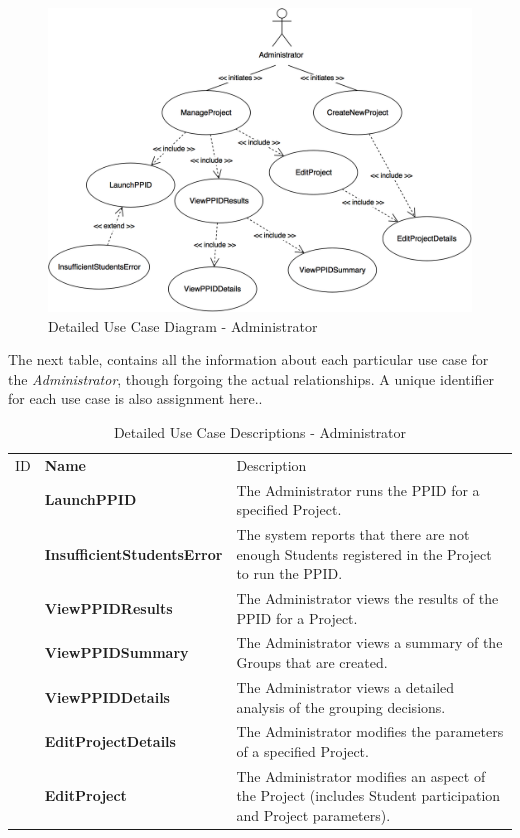 \documentclass[12pt,letterpaper]{article}
\begin{document}
\begin{figure}[H]
	\centering{}
	\includegraphics[scale=0.26]{imgs/detailed-administrator-use-case-diagram.png}
	\caption{Detailed Use Case Diagram - Administrator}
\end{figure}
The next table,  contains all the information about each particular use case for the {\it Administrator}, though forgoing the actual relationships. A unique identifier for each use case is also assignment here.. %

\begin{table}[H]
	\caption{Detailed Use Case Descriptions - Administrator}
	\begin{tabu} to 
	    \tableheader{}ID & Name & Description\\
		\launchppid{} & LaunchPPID & The Administrator runs the PPID for a specified Project.\\
		\insufficientstudentserror{} & InsufficientStudentsError & The system reports that there are not enough Students registered in the Project to run the PPID.\\
		\viewppidresults{} & ViewPPIDResults & The Administrator views the results of the PPID for a Project.\\
		\viewppidsummary{} & ViewPPIDSummary & The Administrator views a summary of the Groups that are created.\\
		\viewppiddetails{} & ViewPPIDDetails & The Administrator views a detailed analysis of the grouping decisions.\\
		\editprojectdetails{} & EditProjectDetails & The Administrator modifies the parameters of a specified Project.\\
		\editproject{} & EditProject & The Administrator modifies an aspect of the Project (includes Student participation and Project parameters).\\
	\end{tabu}
\end{table}
\end{document}
